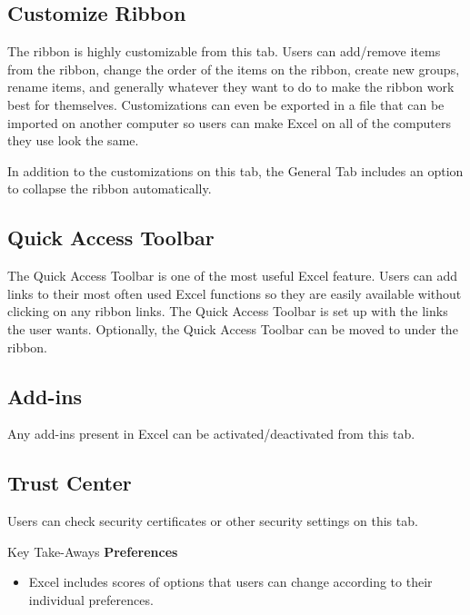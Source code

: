 \subsection{Customize Ribbon}

The ribbon is highly customizable from this tab. Users can add/remove items from the ribbon, change the order of the items on the ribbon, create new groups, rename items, and generally whatever they want to do to make the ribbon work best for themselves. Customizations can even be exported in a file that can be imported on another computer so users can make Excel on all of the computers they use look the same.

In addition to the customizations on this tab, the General Tab includes an option to collapse the ribbon automatically.

\subsection{Quick Access Toolbar}

The Quick Access Toolbar is one of the most useful Excel feature. Users can add links to their most often used Excel functions so they are easily available without clicking on any ribbon links. The Quick Access Toolbar is set up with the links the user wants. Optionally, the Quick Access Toolbar can be moved to under the ribbon.

\subsection{Add-ins}

Any add-ins present in Excel can be activated/deactivated from this tab.

\subsection{Trust Center}

Users can check security certificates or other security settings on this tab.

\begin{center}
	\begin{tkwbox}{Key Take-Aways}
		\textbf{Preferences}
		\\
		\begin{itemize}
			\setlength{\itemsep}{0pt}
			\setlength{\parskip}{0pt}
			\setlength{\parsep}{0pt}
			
			\item Excel includes scores of options that users can change according to their individual preferences.
			
		\end{itemize}
	\end{tkwbox}
\end{center}

